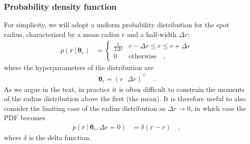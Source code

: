\documentclass[modern]{aastex62}
\begin{document}
\subsubsection{Probability density function}
%
For simplicity, we will adopt a uniform probability distribution for the
spot radius, characterized by a mean radius $r$ and a half-width $\Delta r$:
%
\begin{align}
    p(\mathbb{r} \, \big| \, \pmb{\theta}_{r})
     & =
    \begin{cases}
        \frac{1}{2\Delta r} & r - \Delta r \leq r \leq r + \Delta r
        \\
        0                   & \mathrm{otherwise}
        \quad,
    \end{cases}
\end{align}
%
where the hyperparameters of the distribution are
%
\begin{align}
    \pmb{\theta}_r = \left(
    r \, \, \, \,
    \Delta r \right)^\top
    \quad.
\end{align}
%
As we argue in the text, in practice it is often difficult to constrain the
moments of the radius distribution above the first (the mean). It is
therefore useful to also consider the limiting case of the radius distribution
as $\Delta r \rightarrow 0$, in which case the PDF becomes
%
\begin{align}
    p(\mathbb{r} \, \big| \, \pmb{\theta}_{r}, \Delta r = 0)
     & =
    \delta(\mathbb{r} - r)
    \quad,
\end{align}
%
where $\delta$ is the delta function.
%
\end{document}
